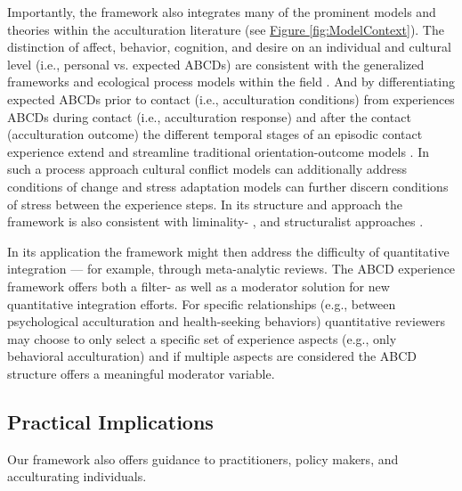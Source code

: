 \documentclass[man, 12pt, a4paper, mask]{apa7}
\begin{document}
Importantly, the framework also integrates many of the prominent models and theories within the acculturation literature (see \hyperref[fig:ModelContext]{Figure \ref*{fig:ModelContext}}). The distinction of affect, behavior, cognition, and desire on an individual and cultural level (i.e., personal vs. expected ABCDs) are consistent with the generalized frameworks \citep[e.g.,][]{Berry2005, Cross1991} and ecological process models within the field \citep[e.g.,][]{Ward2016, Serdarevic2005, Mistry2010}. And by differentiating expected ABCDs prior to contact (i.e., acculturation conditions) from experiences ABCDs during contact (i.e., acculturation response) and after the contact (acculturation outcome) the different temporal stages of an episodic contact experience extend and streamline traditional orientation-outcome models \citep[e.g.,][]{Arends-Toth2006a, TeLindert2008a}. In such a process approach cultural conflict models can additionally address conditions of change \citep[e.g.,][]{Robinson2019} and stress adaptation models can further discern conditions of stress \citep[e.g.,][]{Kim1988, Hajro2019, Sam2006b} between the experience steps. In its structure and approach the framework is also consistent with liminality- \citep[e.g.,][]{Loon2021, Baird2015}, and structuralist approaches \citep[e.g.,][]{Kemppainen2020}.

In its application the framework might then address the difficulty of quantitative integration --- for example, through meta-analytic reviews. The ABCD experience framework offers both a filter- as well as a moderator solution for new quantitative integration efforts. For specific relationships (e.g., between psychological acculturation and health-seeking behaviors) quantitative reviewers may choose to only select a specific set of experience aspects (e.g., only behavioral acculturation) and if multiple aspects are considered the ABCD structure offers a meaningful moderator variable. 

\subsection{Practical Implications}
Our framework also offers guidance to practitioners, policy makers, and acculturating individuals. 

\end{document}

